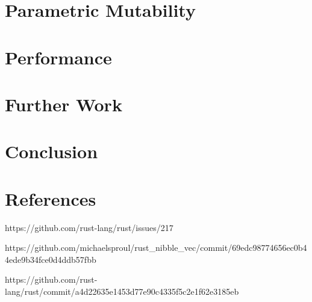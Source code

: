 \documentclass[a4paper,12pt]{article}
\begin{document}
\section{Parametric Mutability}

\section{Performance}

\section{Further Work}

\section{Conclusion}

\section{References}

https://github.com/rust-lang/rust/issues/217

https://github.com/michaelsproul/rust\_nibble\_vec/commit/69edc98774656ec0b44ede9b34fce0d4ddb57fbb

https://github.com/rust-lang/rust/commit/a4d22635e1453d77e90c4335f5c2e1f62e3185eb
\end{document}
